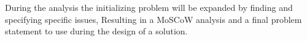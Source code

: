 During the analysis the initializing problem will be expanded by finding and specifying specific issues, Resulting in a MoSCoW analysis and a final problem statement to use during the design of a solution.


% 




